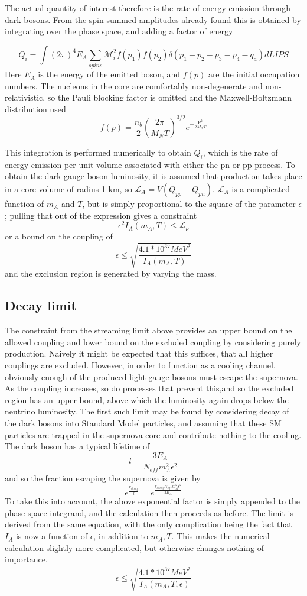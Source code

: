 \documentclass[10pt,a4paper]{article}
\begin{document}
	The actual quantity of interest therefore is the rate of energy emission through dark bosons. From the spin-summed amplitudes already found this is obtained by integrating over the phase space, and adding a factor of energy

	\[ Q_i = \int (2\pi)^4 E_A \sum_{spins} \mathcal{M}^2_i f(p_1) f(p_2)\delta(p_1+p_2-p_3-p_4-q_a) dLIPS \]
	Here $ E_A $ is the energy of the emitted boson, and $ f(p) $ are the initial occupation numbers. The nucleons in the core are comfortably non-degenerate and non-relativistic, so  the Pauli blocking factor is omitted and the Maxwell-Boltzmann distribution used  \[ f(p) =  \frac{n_b}{2} (\frac{2 \pi}{M_N T})^{3/2} e^{-\frac{\textbf{p}^2} {2 M_N T}} \]
	
	This integration is performed numerically to obtain $ Q_i $, which is the rate of energy emission per unit volume associated with either the pn or pp process. To obtain the dark gauge boson luminosity, it is assumed that production takes place in a core volume of radius 1 km, so $ \mathcal{L}_A = V(Q_{pp} + Q_{pn}) $. $ \mathcal{L}_A $ is a complicated function of $ m_A $ and $ T $, but is simply proportional to the square of the parameter $ \epsilon $; pulling that out of the expression gives a constraint \[ \epsilon^2 I_A(m_A, T) \le \mathcal{L}_\nu \] or a bound on the coupling of \[ \epsilon \le \sqrt{\frac{4.1 * 10^{37} MeV^2}{I_A(m_A, T)}} \] and the exclusion region is generated by varying the mass. 

	\subsection{Decay limit}
	The constraint from the streaming limit above provides an upper bound on the allowed coupling and lower bound on the excluded coupling by considering purely production. Naively it might be expected that this suffices, that all higher couplings are excluded. However, in order to function as a cooling channel, obviously enough of the produced light gauge bosons must escape the supernova. As the coupling increases, so do processes that prevent this,and so the excluded region has an upper bound, above which the luminosity again drops below the neutrino luminosity. The first such limit may be found by considering decay of the dark bosons into Standard Model particles, and assuming that these SM particles are trapped in the supernova core and contribute nothing to the cooling. The dark boson has a typical lifetime of 
	\[ l = \frac{3 E_{A}}{N_{eff} m_A^2 \epsilon^2}  \]
	and so the fraction escaping the supernova is given by 
	\[ e^{\frac{r_{decay}}{l}} = e^{\frac{r_{decay} N_{eff} m_A^2 \epsilon^2}{3 E_A}} \] To take this into account, the above exponential factor is simply appended to the phase space integrand, and the calculation then proceeds as before. The limit is derived from the same equation, with the only complication being the fact that $ I_A $ is now a function of $ \epsilon $, in addition to $ m_A, T $. This makes the numerical calculation slightly more complicated, but otherwise changes nothing of importance. 
	 \[ \epsilon \le \sqrt{\frac{4.1 * 10^{37} MeV^2}{I_A(m_A, T, \epsilon)}} \]
	
\end{document}
